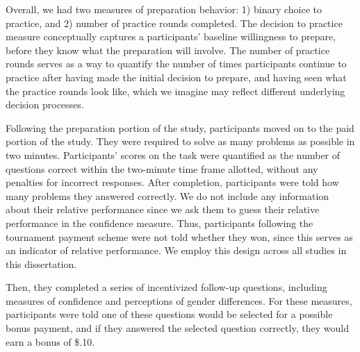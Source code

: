 \documentclass[a4paper, nobind]{templates/ociamthesis}
\begin{document}
Overall, we had two measures of preparation behavior: 1) binary choice to practice, and 2) number of practice rounds completed. The decision to practice measure conceptually captures a participants' baseline willingness to prepare, before they know what the preparation will involve. The number of practice rounds serves as a way to quantify the number of times participants continue to practice after having made the initial decision to prepare, and having seen what the practice rounds look like, which we imagine may reflect different underlying decision processes.

Following the preparation portion of the study, participants moved on to the paid portion of the study. They were required to solve as many problems as possible in two minutes. Participants' scores on the task were quantified as the number of questions correct within the two-minute time frame allotted, without any penalties for incorrect responses. After completion, participants were told how many problems they answered correctly. We do not include any information about their relative performance since we ask them to guess their relative performance in the confidence measure. Thus, participants following the tournament payment scheme were not told whether they won, since this serves as an indicator of relative performance. We employ this design across all studies in this dissertation.

Then, they completed a series of incentivized follow-up questions, including measures of confidence and perceptions of gender differences. For these measures, participants were told one of these questions would be selected for a possible bonus payment, and if they answered the selected question correctly, they would earn a bonus of \$.10.
\end{document}
